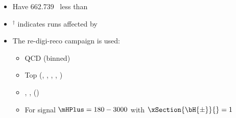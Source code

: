 \vspace{0.2cm}
\begin{itemize}
\item Have 662.739 \sInvPb\ \textcolor{kRed}{less} than \FebReMiniAOD
\item $^{\dagger}$ indicates runs affected by \SiStripHitEffLoss
\end{itemize}

\vspace{0.2cm}
\begin{itemize}%
\item The \MoriondTwentySeventeen re-digi-reco campaign is used:
  \begin{itemize}%
  \item QCD (\HT binned)
  \item Top (\SingleTop, \TT, \TTZ, \TTW, \TTTT)
  \item \WJets, \DYJets, \Diboson (\DibosonExplicit)
  \item For signal $\mHPlus = 180 - 3000$  with $\xSection{\bH{\pm}}{} = 1$ \sPb
  \end{itemize}%
\end{itemize}%
